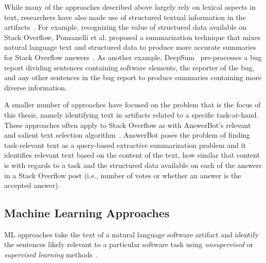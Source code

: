 

While many of the approaches described above
largely rely on  lexical aspects in text, researchers have also made
use
of structured textual information in the artifacts~\cite{Ponzanelli2015, Treude2016, chen2016}. 
For example, recognizing the value of structured data available on Stack Overflow, Ponzanelli et al. 
proposed a summarization technique that mixes natural language text and structured data to produce more accurate summaries for Stack Overflow answers~\cite{Ponzanelli2015}. 
As another example, DeepSum~\cite{Li2018} pre-processes a bug report dividing sentences containing software elements, the reporter of the bug, and any other sentences in the bug report to produce summaries containing more diverse information.




A smaller number of approaches have focused
on the problem that is the focus of this
thesis, namely identifying text in artifacts
related to a specific task-at-hand.
These approaches often apply to Stack Overflow 
as with AnswerBot's relevant and salient text selection algorithm~\cite{Xu2017}. AnswerBot poses the problem of finding task-relevant text 
as a query-based extractive summarization problem and it identifies relevant text based on 
the content of the text, how similar that content is with regards to a task and the structured data available on each of the answers in a Stack Overflow post (i.e., number of votes or whether an answer is the accepted answer).


\subsection{Machine Learning Approaches}


\acf{ML} approaches take the text of a natural language software artifact and identify 
the sentences likely relevant to a particular software task using \textit{unsupervised} or 
\textit{supervised learning} methods~\cite{zhang2005machine}.



